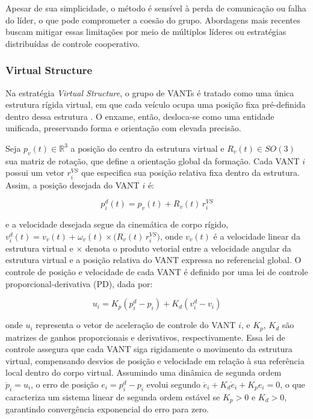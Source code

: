Apesar de sua simplicidade, o método é sensível à perda de comunicação ou falha do líder, o que pode comprometer a coesão do grupo. Abordagens mais recentes buscam mitigar essas limitações por meio de múltiplos líderes ou estratégias distribuídas de controle cooperativo.


\subsubsection{Virtual Structure}

Na estratégia \textit{Virtual Structure}, o grupo de VANTs é tratado como uma única estrutura rígida virtual, em que cada veículo ocupa uma posição fixa pré-definida dentro dessa estrutura \citep{bu2024advancement, askari2015virtualstructure}. O enxame, então, desloca-se como uma entidade unificada, preservando forma e orientação com elevada precisão.

Seja $p_v(t) \in \mathbb{R}^3$ a posição do centro da estrutura virtual e $R_v(t) \in SO(3)$ sua matriz de rotação, que define a orientação global da formação. Cada VANT $i$ possui um vetor $r_i^{VS}$ que especifica sua posição relativa fixa dentro da estrutura. Assim, a posição desejada do VANT $i$ é:

\begin{equation}
p_i^{d}(t) = p_v(t) + R_v(t)\, r_i^{VS}
\end{equation}

e a velocidade desejada segue da cinemática de corpo rígido, $v_i^{d}(t) = v_v(t) + \omega_v(t) \times \big( R_v(t)\, r_i^{VS} \big)$, onde $v_v(t)$ é a velocidade linear da estrutura virtual e $\times$ denota o produto vetorial entre a velocidade angular da estrutura virtual e a posição relativa do VANT expressa no referencial global. O controle de posição e velocidade de cada VANT é definido por uma lei de controle proporcional-derivativa (PD), dada por:

\begin{equation}
u_i = K_p (p_i^{d} - p_i) + K_d (v_i^{d} - v_i)
\end{equation}

onde $u_i$ representa o vetor de aceleração de controle do VANT $i$, e $K_p$, $K_d$ são matrizes de ganhos proporcionais e derivativos, respectivamente. Essa lei de controle assegura que cada VANT siga rigidamente o movimento da estrutura virtual, compensando desvios de posição e velocidade em relação à sua referência local dentro do corpo virtual. Assumindo uma dinâmica de segunda ordem $\ddot{p}_i = u_i$, o erro de posição $e_i = p_i^{d} - p_i$ evolui segundo $\ddot{e}_i + K_d \dot{e}_i + K_p e_i = 0$, o que caracteriza um sistema linear de segunda ordem estável se $K_p > 0$ e $K_d > 0$, garantindo convergência exponencial do erro para zero.

